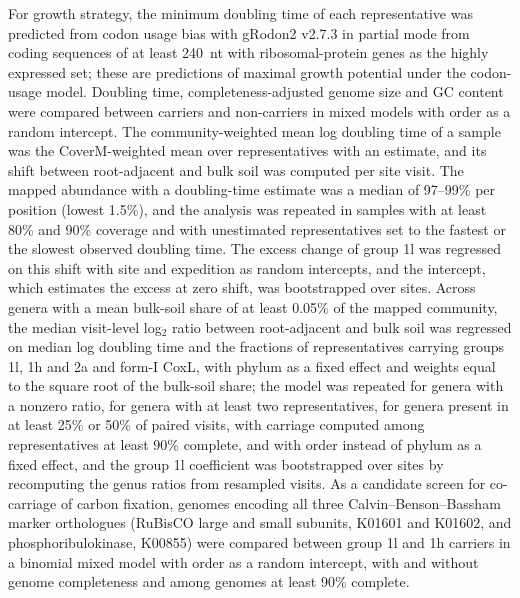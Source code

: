 \documentclass[11pt]{article}
\begin{document}
For growth strategy, the minimum doubling time of each representative was predicted from codon usage bias
with gRodon2 v2.7.3 \citep{weissman2021grodon} in partial mode from coding sequences of at least 240~nt
with ribosomal-protein genes as the highly expressed set; these are predictions of maximal growth
potential under the codon-usage model. Doubling time, completeness-adjusted genome size and GC content were
compared between carriers and non-carriers in mixed models with order as a random intercept. The
community-weighted mean log doubling time of a sample was the CoverM-weighted mean over representatives
with an estimate, and its shift between root-adjacent and bulk soil was computed per site visit. The
mapped abundance with a doubling-time estimate was a median of 97--99\% per position (lowest 1.5\%), and the
analysis was repeated in samples with at least 80\% and 90\% coverage and with unestimated representatives
set to the fastest or the slowest observed doubling time. The
excess change of group 1l was regressed on this shift with site and expedition as random intercepts, and
the intercept, which estimates the excess at zero shift, was bootstrapped over sites. Across genera with a
mean bulk-soil share of at least 0.05\% of the mapped community, the median visit-level log$_2$ ratio
between root-adjacent and bulk soil was regressed on median log doubling time and the fractions of
representatives carrying groups 1l, 1h and 2a and form-I CoxL, with phylum as a fixed effect and weights
equal to the square root of the bulk-soil share; the model was repeated for genera with a nonzero ratio,
for genera with at least two representatives, for genera present in at least 25\% or 50\% of paired visits,
with carriage computed among representatives at least 90\% complete, and with order instead of phylum as a
fixed effect, and the group 1l coefficient was bootstrapped over sites by recomputing the genus ratios from
resampled visits. As a candidate screen for co-carriage of carbon fixation, genomes encoding all three
Calvin--Benson--Bassham marker orthologues (RuBisCO large and small subunits, K01601 and K01602, and
phosphoribulokinase, K00855) were compared between group 1l and 1h carriers in a binomial mixed model with
order as a random intercept, with and without genome completeness and among genomes at least 90\% complete.
\end{document}
